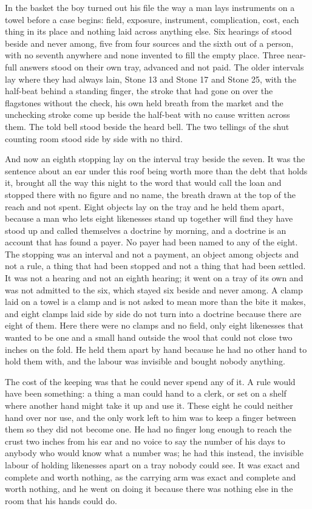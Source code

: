 In the basket the boy turned out his file the way a man lays instruments on a towel before a case begins: field, exposure, instrument, complication, cost, each thing in its place and nothing laid across anything else. Six hearings of  stood beside and never among, five from four sources and the sixth out of a person, with no seventh anywhere and none invented to fill the empty place. Three near-full answers stood on their own tray, advanced and not paid. The older intervals lay where they had always lain, Stone 13 and Stone 17 and Stone 25, with the half-beat behind a standing finger, the stroke that had gone on over the flagstones without the check, his own held breath from the market and the unchecking stroke come up beside the half-beat with no cause written across them. The told bell stood beside the heard bell. The two tellings of the shut counting room stood side by side with no third.

And now an eighth stopping lay on the interval tray beside the seven. It was the sentence about an ear under this roof being worth more than the debt that holds it, brought all the way this night to the word that would call the loan and stopped there with no figure and no name, the breath drawn at the top of the reach and not spent. Eight objects lay on the tray and he held them apart, because a man who lets eight likenesses stand up together will find they have stood up and called themselves a doctrine by morning, and a doctrine is an account that has found a payer. No payer had been named to any of the eight. The stopping was an interval and not a payment, an object among objects and not a rule, a thing that had been stopped and not a thing that had been settled. It was not a hearing and not an eighth hearing; it went on a tray of its own and was not admitted to the six, which stayed six beside and never among. A clamp laid on a towel is a clamp and is not asked to mean more than the bite it makes, and eight clamps laid side by side do not turn into a doctrine because there are eight of them. Here there were no clamps and no field, only eight likenesses that wanted to be one and a small hand outside the wool that could not close two inches on the fold. He held them apart by hand because he had no other hand to hold them with, and the labour was invisible and bought nobody anything.

The cost of the keeping was that he could never spend any of it. A rule would have been something: a thing a man could hand to a clerk, or set on a shelf where another hand might take it up and use it. These eight he could neither hand over nor use, and the only work left to him was to keep a finger between them so they did not become one. He had no finger long enough to reach the crust two inches from his ear and no voice to say the number of his days to anybody who would know what a number was; he had this instead, the invisible labour of holding likenesses apart on a tray nobody could see. It was exact and complete and worth nothing, as the carrying arm was exact and complete and worth nothing, and he went on doing it because there was nothing else in the room that his hands could do.

